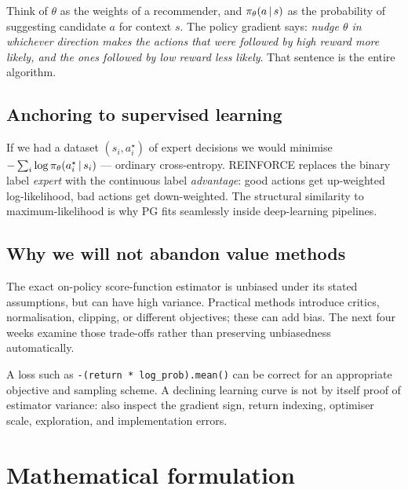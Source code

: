 \documentclass[11pt,oneside]{scrbook}
\begin{document}
\begin{intuition}
Think of $\theta$ as the weights of a recommender, and $\pi_\theta(a\,\vert\, s)$ as the probability of suggesting candidate $a$ for context $s$. The policy gradient says: \emph{nudge $\theta$ in whichever direction makes the actions that were followed by high reward more likely, and the ones followed by low reward less likely}. That sentence is the entire algorithm.
\end{intuition}

\section*{Anchoring to supervised learning}
If we had a dataset $(s_i, a_i^\star)$ of expert decisions we would minimise $-\sum_i \log \pi_\theta(a_i^\star\,\vert\, s_i)$ --- ordinary cross-entropy. REINFORCE replaces the binary label \emph{expert} with the continuous label \emph{advantage}: good actions get up-weighted log-likelihood, bad actions get down-weighted. The structural similarity to maximum-likelihood is why PG fits seamlessly inside deep-learning pipelines.

\section*{Why we will not abandon value methods}
The exact on-policy score-function estimator is unbiased under its stated
assumptions, but can have high variance. Practical methods introduce critics,
normalisation, clipping, or different objectives; these can add bias.
The next four weeks examine those trade-offs rather than preserving
unbiasedness automatically.

\begin{pitfall}
A loss such as \texttt{-(return * log\_prob).mean()} can be correct for
an appropriate objective and sampling scheme. A declining learning curve is
not by itself proof of estimator variance: also inspect the gradient sign,
return indexing, optimiser scale, exploration, and implementation errors.
\end{pitfall}

\chapter{Mathematical formulation}
\end{document}
